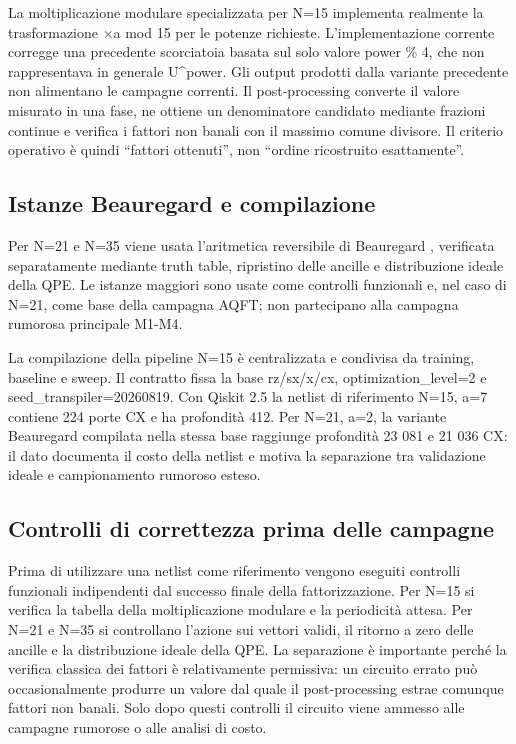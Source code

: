 La moltiplicazione modulare specializzata per N=15 implementa realmente la trasformazione ×a mod 15 per le potenze richieste. L'implementazione corrente corregge una precedente scorciatoia basata sul solo valore power \% 4, che non rappresentava in generale U\^{}power. Gli output prodotti dalla variante precedente non alimentano le campagne correnti. Il post-processing converte il valore misurato in una fase, ne ottiene un denominatore candidato mediante frazioni continue e verifica i fattori non banali con il massimo comune divisore. Il criterio operativo è quindi ``fattori ottenuti'', non ``ordine ricostruito esattamente''.

\subsection{Istanze Beauregard e compilazione}\label{sec:finale_4_3_2}

Per N=21 e N=35 viene usata l'aritmetica reversibile di Beauregard \cite{beauregard2002}, verificata separatamente mediante truth table, ripristino delle ancille e distribuzione ideale della QPE. Le istanze maggiori sono usate come controlli funzionali e, nel caso di N=21, come base della campagna AQFT; non partecipano alla campagna rumorosa principale M1-M4.

La compilazione della pipeline N=15 è centralizzata e condivisa da training, baseline e sweep. Il contratto fissa la base rz/sx/x/cx, optimization\_level=2 e seed\_transpiler=20260819. Con Qiskit 2.5 la netlist di riferimento N=15, a=7 contiene 224 porte CX e ha profondità 412. Per N=21, a=2, la variante Beauregard compilata nella stessa base raggiunge profondità 23 081 e 21 036 CX: il dato documenta il costo della netlist e motiva la separazione tra validazione ideale e campionamento rumoroso esteso.

\subsection{Controlli di correttezza prima delle campagne}\label{sec:finale_4_3_3}

Prima di utilizzare una netlist come riferimento vengono eseguiti controlli funzionali indipendenti dal successo finale della fattorizzazione. Per N=15 si verifica la tabella della moltiplicazione modulare e la periodicità attesa. Per N=21 e N=35 si controllano l'azione sui vettori validi, il ritorno a zero delle ancille e la distribuzione ideale della QPE. La separazione è importante perché la verifica classica dei fattori è relativamente permissiva: un circuito errato può occasionalmente produrre un valore dal quale il post-processing estrae comunque fattori non banali. Solo dopo questi controlli il circuito viene ammesso alle campagne rumorose o alle analisi di costo.

